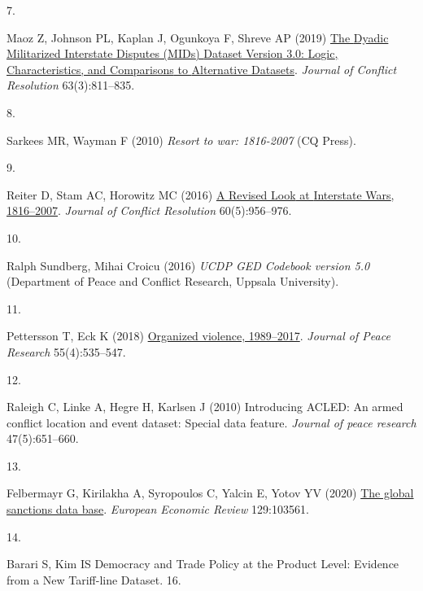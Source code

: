 \documentclass{article}
\newlength{\cslhangindent}
\newlength{\csllabelwidth}
\newlength{\cslentryspacingunit} %
\newenvironment{CSLReferences}[2] %
 {%
  \setlength{\parindent}{0pt}
  \ifodd #1
  \let\oldpar\par
  \def\par{\hangindent=\cslhangindent\oldpar}
  \fi
  \setlength{\parskip}{#2\cslentryspacingunit}
 }%
 {}
\newcommand{\CSLLeftMargin}[1]{\parbox[t]{\csllabelwidth}{#1}}
\newcommand{\CSLRightInline}[1]{\parbox[t]{\linewidth - \csllabelwidth}{#1}\break}
\begin{document}
\begin{CSLReferences}{0}{0}
\leavevmode{}%
\CSLLeftMargin{7. }%
\CSLRightInline{Maoz Z, Johnson PL, Kaplan J, Ogunkoya F, Shreve AP
(2019) \href{https://doi.org/10.1177/0022002718784158}{The {Dyadic
Militarized Interstate Disputes} ({MIDs}) {Dataset Version} 3.0:
{Logic}, {Characteristics}, and {Comparisons} to {Alternative
Datasets}}. \emph{Journal of Conflict Resolution} 63(3):811--835.}

\leavevmode{}%
\CSLLeftMargin{8. }%
\CSLRightInline{Sarkees MR, Wayman F (2010) \emph{Resort to war:
1816-2007} ({CQ Press}).}

\leavevmode{}%
\CSLLeftMargin{9. }%
\CSLRightInline{Reiter D, Stam AC, Horowitz MC (2016)
\href{https://doi.org/10.1177/0022002714553107}{A {Revised Look} at
{Interstate Wars}, 1816--2007}. \emph{Journal of Conflict Resolution}
60(5):956--976.}

\leavevmode{}%
\CSLLeftMargin{10. }%
\CSLRightInline{Ralph Sundberg, Mihai Croicu (2016) \emph{{UCDP GED
Codebook} version 5.0} ({Department of Peace and Conflict Research,
Uppsala University}).}

\leavevmode{}%
\CSLLeftMargin{11. }%
\CSLRightInline{Pettersson T, Eck K (2018)
\href{https://doi.org/10.1177/0022343318784101}{Organized violence,
1989--2017}. \emph{Journal of Peace Research} 55(4):535--547.}

\leavevmode{}%
\CSLLeftMargin{12. }%
\CSLRightInline{Raleigh C, Linke A, Hegre H, Karlsen J (2010)
Introducing {ACLED}: An armed conflict location and event dataset:
Special data feature. \emph{Journal of peace research} 47(5):651--660.}

\leavevmode{}%
\CSLLeftMargin{13. }%
\CSLRightInline{Felbermayr G, Kirilakha A, Syropoulos C, Yalcin E, Yotov
YV (2020) \href{https://doi.org/10.1016/j.euroecorev.2020.103561}{The
global sanctions data base}. \emph{European Economic Review}
129:103561.}

\leavevmode{}%
\CSLLeftMargin{14. }%
\CSLRightInline{Barari S, Kim IS Democracy and {Trade Policy} at the
{Product Level}: {Evidence} from a {New Tariff-line Dataset}. 16.}


\end{CSLReferences}
\end{document}
